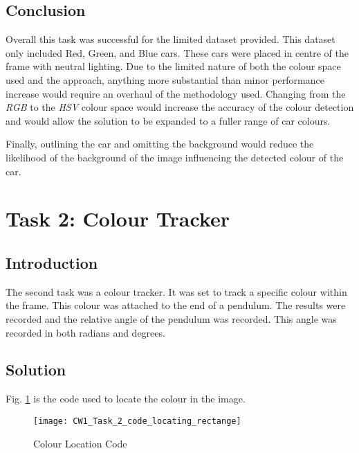 \documentclass[conference]{IEEEtran}
\begin{document}
\subsection{Conclusion}

Overall this task was successful for the limited dataset provided. This dataset only included Red, Green, and Blue cars. These cars were placed in centre of the frame with neutral lighting. Due to the limited nature of both the colour space used and the approach, anything more substantial than minor performance increase would require an overhaul of the methodology used. Changing from the \textit{RGB} to the \textit{HSV} colour space would increase the accuracy of the colour detection and would allow the solution to be expanded to a fuller range of car colours. 

Finally, outlining the car and omitting the background would reduce the likelihood of the background of the image influencing the detected colour of the car.

\section{Task 2: Colour Tracker}

\subsection{Introduction}

The second task was a colour tracker. It was set to track a specific colour within the frame. This colour was attached to the end of a pendulum. The results were recorded and the relative angle of the pendulum was recorded. This angle was recorded in both radians and degrees. 

\subsection{Solution}
Fig. \ref{fig:CW1_Task_2_code_locating_rectange} is the code used to locate the colour in the image. 

\begin{figure}
\centerline{\texttt{[image: CW1\_Task\_2\_code\_locating\_rectange]}}
\caption{Colour Location Code}
\label{fig:CW1_Task_2_code_locating_rectange}
\end{figure}
\end{document}
